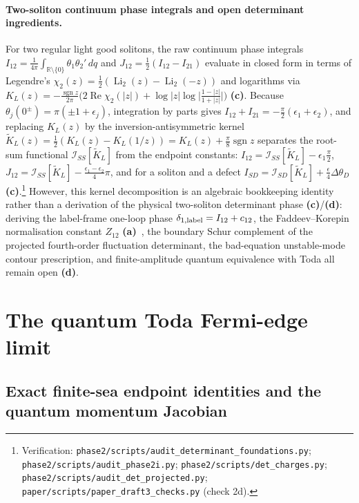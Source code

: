 \documentclass[11pt,a4paper]{article}
\newcommand{\lab}[1]{{\normalfont\sffamily\footnotesize\bfseries(#1)}}
\newcommand{\La}{\lab{a}}
\newcommand{\Lc}{\lab{c}}
\newcommand{\Ld}{\lab{d}}
\newcommand{\scr}[1]{\nolinkurl{#1}}
\newcommand{\chk}[1]{\footnote{\raggedright Verification: #1.}}
\newcommand{\sgn}{\operatorname{sgn}}
\theoremstyle{remark}
\begin{document}
\paragraph{Two-soliton continuum phase integrals and open determinant ingredients.} For two regular light good solitons, the raw continuum phase integrals $I_{12}=\frac1{4\pi}\int_{\mathbb R\setminus\{0\}}\theta_1\theta_2'\,dq$ and $J_{12}=\tfrac12(I_{12}-I_{21})$ evaluate in closed form in terms of Legendre's $\chi_2(z)=\tfrac12(\operatorname{Li}_2(z)-\operatorname{Li}_2(-z))$ and logarithms via $K_L(z)=-\frac{\sgn z}{2\pi}\big(2\operatorname{Re}\chi_2(|z|)+\log|z|\log\big|\frac{1-|z|}{1+|z|}\big|\big)$ \Lc. Because $\theta_j(0^\pm)=\pi(\pm1+\epsilon_j)$, integration by parts gives $I_{12}+I_{21}=-\frac\pi2(\epsilon_1+\epsilon_2)$, and replacing $K_L(z)$ by the inversion-antisymmetric kernel $\widetilde K_L(z)=\tfrac12(K_L(z)-K_L(1/z))=K_L(z)+\frac\pi8\sgn z$ separates the root-sum functional $\mathcal I_{SS}[\widetilde K_L]$ from the endpoint constants: $I_{12}=\mathcal I_{SS}[\widetilde K_L]-\epsilon_1\frac\pi2$, $J_{12}=\mathcal I_{SS}[\widetilde K_L]-\frac{\epsilon_1-\epsilon_2}4\pi$, and for a soliton and a defect $I_{SD}=\mathcal I_{SD}[\widetilde K_L]+\frac\epsilon4\Delta\theta_D$ \Lc.\chk{\scr{phase2/scripts/audit_determinant_foundations.py}; \scr{phase2/scripts/audit_phase2i.py}; \scr{phase2/scripts/det_charges.py}; \scr{phase2/scripts/audit_det_projected.py}; \scr{paper/scripts/paper_draft3_checks.py} (check 2d)}
However, this kernel decomposition is an algebraic bookkeeping identity rather than a derivation of the physical two-soliton determinant phase \Lc/\Ld: deriving the label-frame one-loop phase $\delta_{1,{\rm label}}=I_{12}+c_{12}$, the Faddeev--Korepin normalisation constant $Z_{12}$ \La~\cite[\S5.4]{FK}, the boundary Schur complement of the projected fourth-order fluctuation determinant, the bad-equation unstable-mode contour prescription, and finite-amplitude quantum equivalence with Toda all remain open \Ld.

\section{The quantum Toda Fermi-edge limit}\label{sec:fermi}

\subsection{Exact finite-sea endpoint identities and the quantum momentum Jacobian}\label{sec:todaframe}
\end{document}
